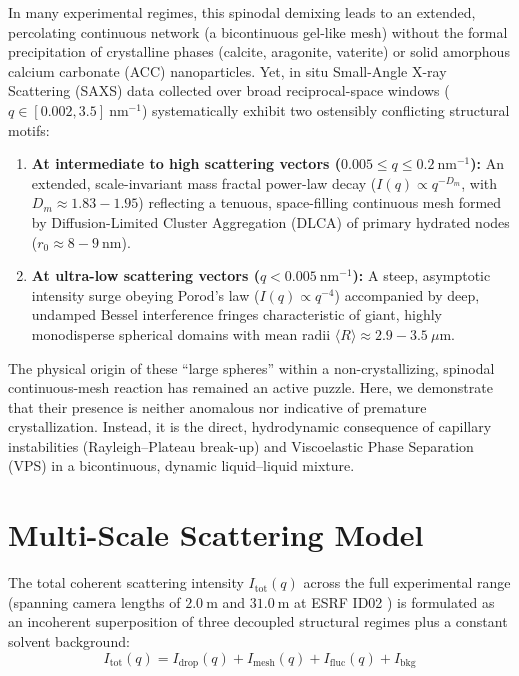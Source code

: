 \documentclass[11pt,a4paper]{article}
\begin{document}
In many experimental regimes, this spinodal demixing leads to an extended, percolating continuous network (a bicontinuous gel-like mesh) without the formal precipitation of crystalline phases (calcite, aragonite, vaterite) or solid amorphous calcium carbonate (ACC) nanoparticles. Yet, in situ Small-Angle X-ray Scattering (SAXS) data collected over broad reciprocal-space windows ($q \in [0.002, 3.5]\ \mathrm{nm}^{-1}$) systematically exhibit two ostensibly conflicting structural motifs:
\begin{enumerate}
    \item \textbf{At intermediate to high scattering vectors ($0.005 \le q \le 0.2\ \mathrm{nm}^{-1}$):} An extended, scale-invariant mass fractal power-law decay ($I(q) \propto q^{-D_m}$, with $D_m \approx 1.83 - 1.95$) reflecting a tenuous, space-filling continuous mesh formed by Diffusion-Limited Cluster Aggregation (DLCA) of primary hydrated nodes ($r_0 \approx 8 - 9\ \mathrm{nm}$).
    \item \textbf{At ultra-low scattering vectors ($q < 0.005\ \mathrm{nm}^{-1}$):} A steep, asymptotic intensity surge obeying Porod's law ($I(q) \propto q^{-4}$) accompanied by deep, undamped Bessel interference fringes characteristic of giant, highly monodisperse spherical domains with mean radii $\langle R \rangle \approx 2.9 - 3.5\ \mu\mathrm{m}$.
\end{enumerate}

The physical origin of these ``large spheres'' within a non-crystallizing, spinodal continuous-mesh reaction has remained an active puzzle. Here, we demonstrate that their presence is neither anomalous nor indicative of premature crystallization. Instead, it is the direct, hydrodynamic consequence of capillary instabilities (Rayleigh--Plateau break-up) and Viscoelastic Phase Separation (VPS) in a bicontinuous, dynamic liquid--liquid mixture.

\section{Multi-Scale Scattering Model}

The total coherent scattering intensity $I_{\mathrm{tot}}(q)$ across the full experimental range (spanning camera lengths of $2.0\ \mathrm{m}$ and $31.0\ \mathrm{m}$ at ESRF ID02 \cite{narayanan2018id02}) is formulated as an incoherent superposition of three decoupled structural regimes plus a constant solvent background:
\begin{equation}
I_{\mathrm{tot}}(q) = I_{\mathrm{drop}}(q) + I_{\mathrm{mesh}}(q) + I_{\mathrm{fluc}}(q) + I_{\mathrm{bkg}}
\label{eq:Itot}
\end{equation}
\end{document}
